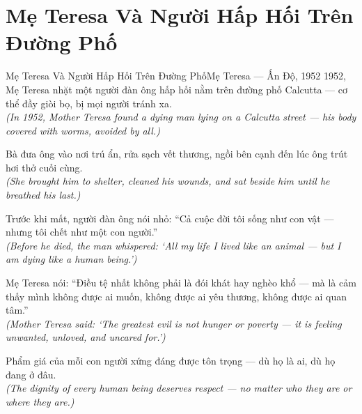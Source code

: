 \section{Mẹ Teresa Và Người Hấp Hối Trên Đường Phố}
\begin{truyen}{Mẹ Teresa Và Người Hấp Hối Trên Đường Phố}{Mẹ Teresa --- Ấn Độ, 1952}
 1952, Mẹ Teresa nhặt một người đàn ông hấp hối nằm trên đường phố Calcutta --- cơ thể đầy giòi bọ, bị mọi người tránh xa.\\[4pt]
\textit{(In 1952, Mother Teresa found a dying man lying on a Calcutta street --- his body covered with worms, avoided by all.)}

Bà đưa ông vào nơi trú ẩn, rửa sạch vết thương, ngồi bên cạnh đến lúc ông trút hơi thở cuối cùng.\\[4pt]
\textit{(She brought him to shelter, cleaned his wounds, and sat beside him until he breathed his last.)}

Trước khi mất, người đàn ông nói nhỏ: ``Cả cuộc đời tôi sống như con vật --- nhưng tôi chết như một con người.''\\[4pt]
\textit{(Before he died, the man whispered: `All my life I lived like an animal --- but I am dying like a human being.')}

Mẹ Teresa nói: ``Điều tệ nhất không phải là đói khát hay nghèo khổ --- mà là cảm thấy mình không được ai muốn, không được ai yêu thương, không được ai quan tâm.''\\[4pt]
\textit{(Mother Teresa said: `The greatest evil is not hunger or poverty --- it is feeling unwanted, unloved, and uncared for.')}

\end{truyen}
\begin{baihoc}
  Phẩm giá của mỗi con người xứng đáng được tôn trọng --- dù họ là ai, dù họ đang ở đâu.\\[4pt]
  \textit{(The dignity of every human being deserves respect --- no matter who they are or where they are.)}
\end{baihoc}
